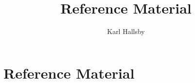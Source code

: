 \documentclass[10pt,letterpaper,final,twoside,notitlepage]{article}
\author{Karl Hallsby}
\title{Reference Material}
\theoremstyle{plain}
\theoremstyle{definition}
\theoremstyle{remark}
\begin{document}
\tableofcontents
\clearpage
{} %











	







\clearpage
\appendix
{}

\section{Reference Material} \label{sec:Reference Material}


\end{document}
